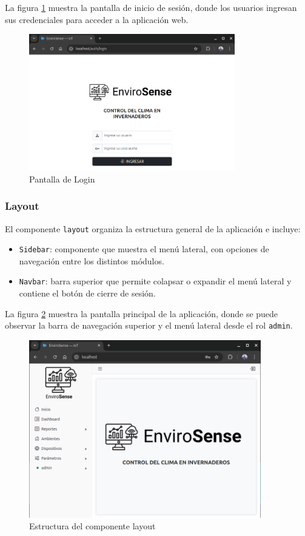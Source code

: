 La figura \ref{fig:login} muestra la pantalla de inicio de sesión, donde los
usuarios ingresan sus credenciales para acceder a la aplicación web.

\begin{figure}[H]
    \centering
    \includegraphics[width=0.80\textwidth]{./Images/24_login.png}
    \caption{Pantalla de Login}
    \label{fig:login}
\end{figure}

\subsubsection{Layout}

El componente \texttt{layout} organiza la estructura general de la aplicación e
incluye:
\begin{itemize}
    \item \texttt{Sidebar}: componente que muestra el menú lateral, con opciones de navegación
          entre los distintos módulos.
    \item \texttt{Navbar}: barra superior que permite colapsar o expandir el menú lateral y
          contiene el botón de cierre de sesión.
\end{itemize}

La figura \ref{fig:layout} muestra la pantalla principal de la aplicación,
donde se puede observar la barra de navegación superior y el menú lateral desde
el rol \texttt{admin}.

\begin{figure}[H]
    \centering
    \includegraphics[width=0.90\textwidth]{./Images/25_layout.png}
    \caption{Estructura del componente layout}
    \label{fig:layout}
\end{figure}

